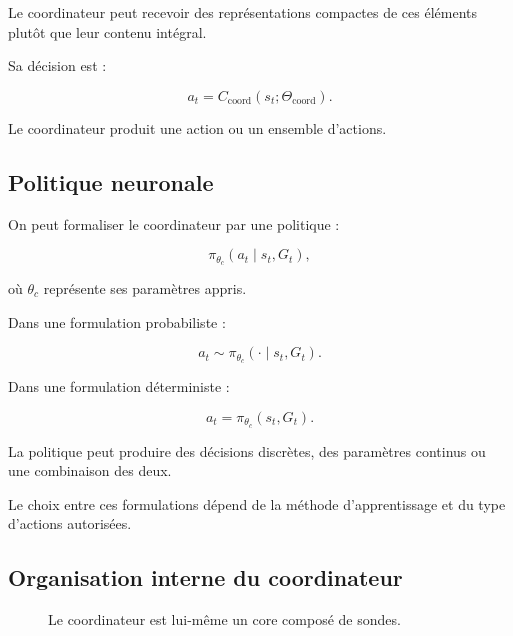 \documentclass[11pt,a4paper]{article}
\begin{document}
Le coordinateur peut recevoir des représentations compactes de ces
éléments plutôt que leur contenu intégral.

Sa décision est :

\[
a_t =
C_{\mathrm{coord}}
(s_t;\Theta_{\mathrm{coord}}).
\]

Le coordinateur produit une action ou un ensemble d'actions.

\subsection{Politique neuronale}

On peut formaliser le coordinateur par une politique :

\[
\pi_{\theta_c}(a_t\mid s_t,G_t),
\]

où $\theta_c$ représente ses paramètres appris.

Dans une formulation probabiliste :

\[
a_t
\sim
\pi_{\theta_c}(\cdot\mid s_t,G_t).
\]

Dans une formulation déterministe :

\[
a_t
=
\pi_{\theta_c}(s_t,G_t).
\]

La politique peut produire des décisions discrètes, des paramètres
continus ou une combinaison des deux.

Le choix entre ces formulations dépend de la méthode d'apprentissage
et du type d'actions autorisées.

\subsection{Organisation interne du coordinateur}

\begin{figure}[H]
\centering
{}
\caption{Le coordinateur est lui-même un core composé de sondes.}
\end{figure}
\end{document}
